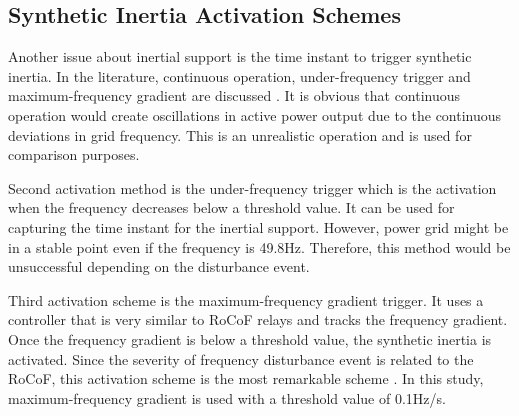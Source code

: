 \subsection{Synthetic Inertia Activation Schemes}
Another issue about inertial support is the time instant to trigger synthetic inertia. In the literature, continuous operation, under-frequency trigger and maximum-frequency gradient are discussed \cite{Gonzalez-longatt2015}. It is obvious that continuous operation would create oscillations in active power output due to the continuous deviations in grid frequency. This is an unrealistic operation and is used for comparison purposes.\par
Second activation method is the under-frequency trigger which is the activation when the frequency decreases below a threshold value. It can be used for capturing the time instant for the inertial support. However, power grid might be in a stable point even if the frequency is 49.8Hz. Therefore, this method would be unsuccessful depending on the disturbance event. \par 
Third activation scheme is the maximum-frequency gradient trigger. It uses a controller that is very similar to RoCoF relays and tracks the frequency gradient. Once the frequency gradient is below a threshold value, the synthetic inertia is activated. Since the severity of frequency disturbance event is related to the RoCoF, this activation scheme is the most remarkable scheme \cite{Gonzalez-longatt2015}. In this study, maximum-frequency gradient is used with a threshold value of 0.1Hz/s. 
